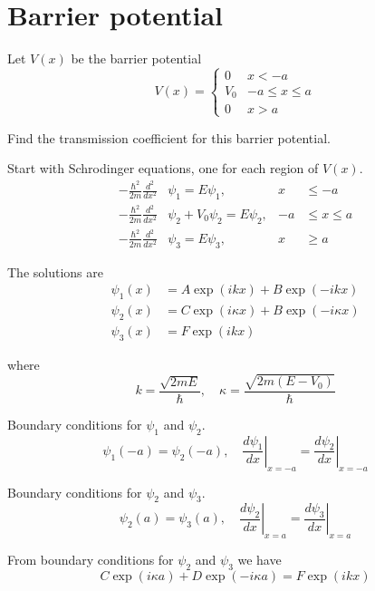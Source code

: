 

\section*{Barrier potential}

Let $V(x)$ be the barrier potential
\begin{equation*}
V(x)=\begin{cases}
0 & x<-a
\\
V_0 & -a\le x\le a
\\
0 & x>a
\end{cases}
\end{equation*}

Find the transmission coefficient for this barrier potential.

\bigskip
Start with Schrodinger equations, one for each region of $V(x)$.
\begin{align*}
-\frac{\hbar^2}{2m}\frac{d^2}{dx^2}&\psi_1=E\psi_1, & x&\le-a
\\[1ex]
-\frac{\hbar^2}{2m}\frac{d^2}{dx^2}&\psi_2+V_0\psi_2=E\psi_2, & -a&\le x\le a
\\[1ex]
-\frac{\hbar^2}{2m}\frac{d^2}{dx^2}&\psi_3=E\psi_3, & x&\ge a
\end{align*}

The solutions are
\begin{align*}
\psi_1(x)&=A\exp(ikx)+B\exp(-ikx)
\\
\psi_2(x)&=C\exp(i\kappa x)+B\exp(-i\kappa x)
\\
\psi_3(x)&=F\exp(ikx)
\end{align*}

where
\begin{equation*}
k=\frac{\sqrt{2mE}}{\hbar},\quad
\kappa=\frac{\sqrt{2m(E-V_0)}}{\hbar}
\end{equation*}

Boundary conditions for $\psi_1$ and $\psi_2$.
\begin{equation*}
\psi_1(-a)=\psi_2(-a),\quad
\left.\frac{d\psi_1}{dx}\right|_{x=-a}=\left.\frac{d\psi_2}{dx}\right|_{x=-a}
\end{equation*}

Boundary conditions for $\psi_2$ and $\psi_3$.
\begin{equation*}
\psi_2(a)=\psi_3(a),\quad
\left.\frac{d\psi_2}{dx}\right|_{x=a}=\left.\frac{d\psi_3}{dx}\right|_{x=a}
\end{equation*}

From boundary conditions for $\psi_2$ and $\psi_3$ we have
\begin{equation*}
C\exp(i\kappa a)+D\exp(-i\kappa a)=F\exp(ikx)\tag{1}
\end{equation*}

